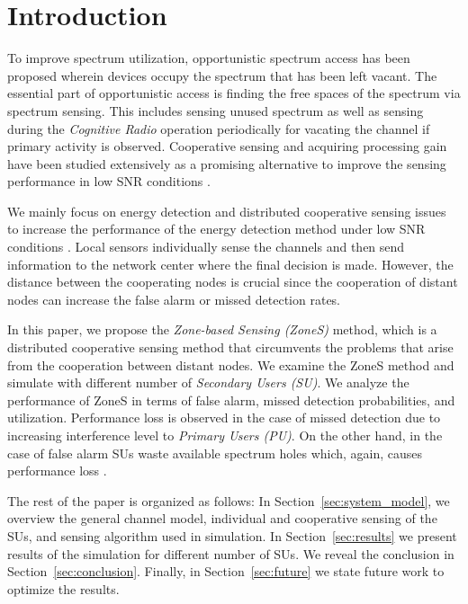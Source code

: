 \documentclass[conference,compsoc]{IEEEtran}
\begin{document}
\IEEEpeerreviewmaketitle



\section{Introduction}

To improve spectrum utilization, opportunistic spectrum access has been proposed wherein devices occupy the spectrum that has been left vacant. The essential part of opportunistic access is finding the free spaces of the spectrum via spectrum sensing. This includes sensing unused spectrum as well as sensing during the \emph{Cognitive Radio} operation periodically for vacating the channel if primary activity is observed. Cooperative sensing and acquiring processing gain have been studied extensively as a promising alternative to improve the sensing performance in low SNR conditions \cite{ganesan2005css, kattepur2007data, quan2008spatial, quan2009optimal, unnikrishnan2008csp, aysal2008cooperative}.

We mainly focus on energy detection and distributed cooperative sensing issues to increase the performance of the energy detection method under low SNR conditions \cite{sensingReview2011}. Local sensors individually sense the channels and then send information to the network center where the final decision is made\cite{crSensingCDMA2010}. However, the distance between the cooperating nodes is crucial since the cooperation of distant nodes can increase the false alarm or missed detection rates.

In this paper, we propose the \textit{Zone-based Sensing (ZoneS)} method, which is a distributed cooperative sensing method that circumvents the problems that arise from the cooperation between distant nodes. We examine the ZoneS method and simulate with different number of \textit{Secondary Users (SU)}. We analyze the performance of ZoneS in terms of false alarm, missed detection probabilities, and utilization. Performance loss is observed in the case of missed detection due to increasing interference level to \textit{Primary Users (PU)}. On the other hand, in the case of false alarm SUs waste available spectrum holes which, again, causes performance loss \cite{parameterOptimization}.

The rest of the paper is organized as follows: In Section~\ref{sec:system_model}, we overview the general channel model, individual and cooperative sensing of the SUs, and sensing algorithm used in simulation. In Section~\ref{sec:results} we present results of the simulation for different number of SUs. We reveal the conclusion in Section~\ref{sec:conclusion}. Finally, in Section~\ref{sec:future} we state future work to optimize the results.
\end{document}
